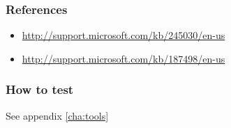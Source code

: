 \subsubsection{References}


\begin{itemize}
\item \url{http://support.microsoft.com/kb/245030/en-us}
\item \url{http://support.microsoft.com/kb/187498/en-us}
\end{itemize}


\subsubsection{How to test}
See appendix \ref{cha:tools}



